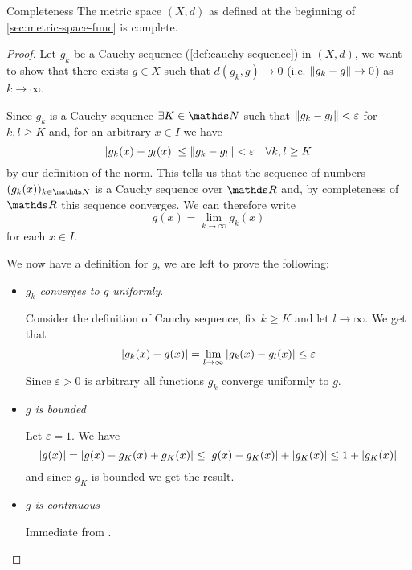 \documentclass[12pt]{extarticle}
\begin{document}
\begin{theorem}{Completeness}{}
    The metric space $(X, d)$ as defined at the beginning of \cref{sec:metric-space-func} is complete.
\end{theorem}
\begin{proof}
    Let $g_k$ be a Cauchy sequence (\cref{def:cauchy-sequence}) in $(X, d)$,
    we want to show that there exists $g \in X$ such that $d(g_k, g) \to 0$ (i.e. $\norm{g_k - g} \to 0$) as $k \to \infty$.

    Since $g_k$ is a Cauchy sequence $\exists K \in \N$ such that $\norm{g_k - g_l} < \varepsilon$ for $k, l \geq K$ and, for an arbitrary $x \in I$ we have
    \begin{equation}
        \abs{g_k(x)-g_l(x)} \leq \norm{g_k - g_l} < \varepsilon \quad \forall k, l \geq K
    \end{equation}
    by our definition of the norm.
    This tells us that the sequence of numbers $(g_k(x))_{k \in \N}$ is a Cauchy sequence over $\R$ and, by completeness of $\R$ this sequence converges.
    We can therefore write
    \begin{equation}
        g(x) = \lim_{k \to \infty} g_k(x)
    \end{equation}
    for each $x \in I$.

    We now have a definition for $g$, we are left to prove the following:
    \begin{itemize}
        \item \emph{$g_k$ converges to $g$ uniformly}.

              Consider the definition of Cauchy sequence, fix $k \geq K$ and let $l \to \infty$.
              We get that
              \begin{equation}
                  \abs{g_k(x) - g(x)} = \lim_{l \to \infty} \abs{g_k(x) - g_l(x)} \leq \varepsilon
              \end{equation}
              Since $\varepsilon > 0$ is arbitrary all functions $g_k$ converge uniformly to $g$.

        \item \emph{$g$ is bounded}

              Let $\varepsilon = 1$.
              We have
              \begin{equation}
                  \abs{g(x)} = \abs{g(x) - g_K(x) + g_K(x)} \leq \abs{g(x) - g_K(x)} + \abs{g_K(x)} \leq 1 + \abs{g_K(x)}
              \end{equation}
              and since $g_K$ is bounded we get the result.

        \item \emph{$g$ is continuous}

              Immediate from .
    \end{itemize}
\end{proof}
\end{document}
